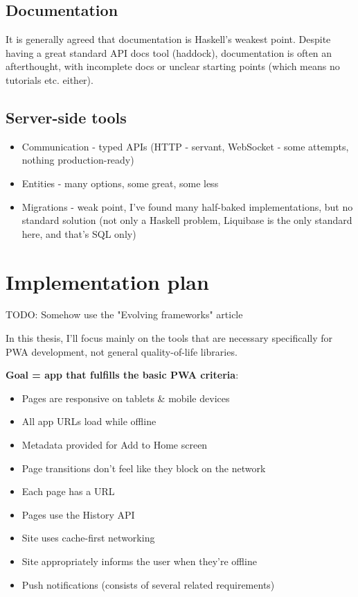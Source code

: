 \documentclass[english,odsaz]{fitthesis}
\begin{document}
\subsection{Documentation}
\label{sec:org5feaa75}
It is generally agreed that documentation is Haskell's weakest point. Despite
having a great standard API docs tool (haddock), documentation is often an
afterthought, with incomplete docs or unclear starting points (which means no
tutorials etc. either).

\subsection{Server-side tools}
\label{sec:orgdaa3c09}
\begin{itemize}
\item Communication - typed APIs (HTTP - servant, WebSocket - some attempts, nothing
production-ready)
\item Entities - many options, some great, some less
\item Migrations - weak point, I've found many half-baked implementations, but no
standard solution (not only a Haskell problem, Liquibase is the only standard
here, and that's SQL only)
\end{itemize}

\section{Implementation plan}
\label{sec:org402967f}
TODO: Somehow use the "Evolving frameworks" article

In this thesis, I'll focus mainly on the tools that are necessary specifically
for PWA development, not general quality-of-life libraries.

\textbf{Goal = app that fulfills the basic PWA criteria}:
\begin{itemize}
\item Pages are responsive on tablets \& mobile devices
\item All app URLs load while offline
\item Metadata provided for Add to Home screen
\item Page transitions don't feel like they block on the network
\item Each page has a URL
\item Pages use the History API
\item Site uses cache-first networking
\item Site appropriately informs the user when they're offline
\item Push notifications (consists of several related requirements)
\end{itemize}
\end{document}
